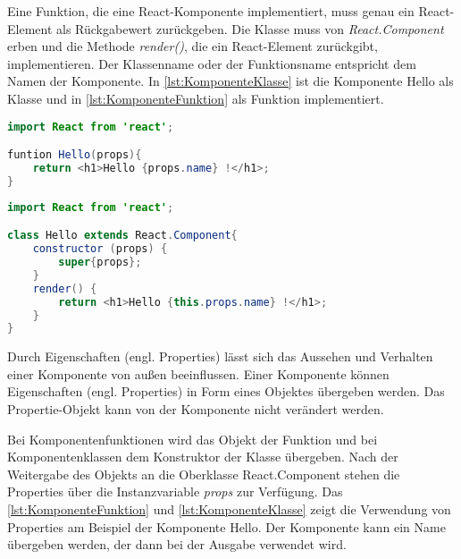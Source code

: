 Eine Funktion, die eine React-Komponente implementiert, muss genau ein React-Element als Rückgabewert zurückgeben. Die Klasse muss von \textit{React.Component} erben und die Methode \textit{render()}, die ein React-Element zurückgibt, implementieren. Der Klassenname oder der Funktionsname entspricht dem Namen der Komponente.\autocite[vgl.][80\psqq]{Zeigermann.2016} In \autoref{lst:KomponenteKlasse} ist die Komponente Hello als Klasse und in \autoref{lst:KomponenteFunktion} als Funktion implementiert.

\begin{lstlisting}[caption=Beispiel einer Komponente als Funktion, label=lst:KomponenteFunktion, language=Java]
import React from 'react';

funtion Hello(props){
	return <h1>Hello {props.name} !</h1>;
}
\end{lstlisting}

\begin{lstlisting}[caption=Beispiel einer Komponente als Klasse, label=lst:KomponenteKlasse, language=Java]
import React from 'react';

class Hello extends React.Component{
	constructor (props) {
		super{props};
	}
	render() {
		return <h1>Hello {this.props.name} !</h1>;
	}
}
\end{lstlisting}

Durch Eigenschaften (engl. Properties) lässt sich das Aussehen und Verhalten einer Komponente von außen beeinflussen. Einer Komponente können Eigenschaften (engl. Properties) in Form eines Objektes übergeben werden. Das Propertie-Objekt kann von der Komponente nicht verändert werden. 

Bei Komponentenfunktionen wird das Objekt der Funktion und bei Komponentenklassen dem Konstruktor der Klasse übergeben. Nach der Weitergabe des Objekts an die Oberklasse React.Component stehen die Properties über die Instanzvariable \textit{props} zur Verfügung. \autocites[vgl.][24\psq,83-88]{Zeigermann.2016}[vgl.][12-17]{Stefanov.2017} Das \autoref{lst:KomponenteFunktion} und \autoref{lst:KomponenteKlasse} zeigt die Verwendung von Properties am Beispiel der Komponente Hello. Der Komponente kann ein Name übergeben werden, der dann bei der Ausgabe verwendet wird.


